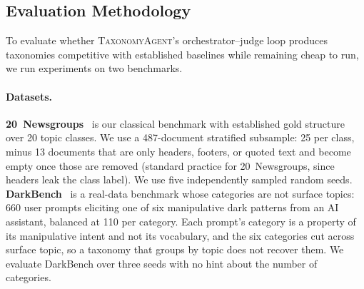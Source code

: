 \subsection{Evaluation Methodology}
\label{sec:eval-method}

To evaluate whether \textsc{TaxonomyAgent}'s orchestrator--judge loop
produces taxonomies competitive with established baselines while
remaining cheap to run, we run experiments on two benchmarks.

\paragraph{Datasets.}
\textbf{20~Newsgroups}~\citep{lang1995newsgroups} is our classical
benchmark with established gold structure over 20 topic classes. We
use a 487-document stratified subsample: 25 per class, minus 13
documents that are only headers, footers, or quoted text and become
empty once those are removed (standard practice for 20~Newsgroups, since
headers leak the class label). We use five independently sampled random
seeds.
\textbf{DarkBench}~\citep{kran2025darkbench} is a real-data benchmark
whose categories are not surface topics: 660 user prompts eliciting one
of six manipulative dark patterns from an AI assistant, balanced at 110
per category. Each prompt's category is a property of its manipulative
intent and not its vocabulary, and the six categories cut across surface
topic, so a taxonomy that groups by topic does not recover them. We evaluate DarkBench over three seeds with no hint about the
number of categories.

